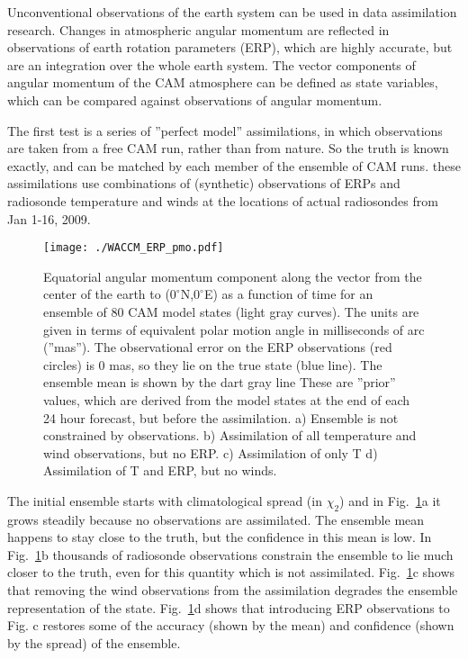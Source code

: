 %
%

Unconventional observations of the earth system can
be used in data assimilation research.
Changes in atmospheric angular momentum are reflected in observations
of earth rotation parameters (ERP),
which are highly accurate, but are an integration over the whole earth system.
The vector components of angular momentum of the CAM atmosphere 
can be defined as state variables,
which can be compared against observations of angular momentum.

The first test is a series of ''perfect model'' assimilations,
in which observations are taken from a free CAM run,
rather than from nature.
So the truth is known exactly, 
and can be matched by each member of the ensemble of CAM runs.
these assimilations use combinations of (synthetic) observations 
of ERPs and radiosonde temperature and winds
at the locations of actual radiosondes from Jan 1-16, 2009.


\begin{figure}[h]
\begin{center}
\texttt{[image: ./WACCM\_ERP\_pmo.pdf]}
\caption{
Equatorial angular momentum component along the vector 
from the center of the earth to ($0^\circ$N,$0^\circ$E)
as a function of time for an ensemble of 80 CAM model states (light gray curves).
The units are given in terms of equivalent polar motion angle in milliseconds of arc (''mas'').
The observational error on the ERP observations (red circles) is 0 mas, 
so they lie on the true state (blue line).
The ensemble mean is shown by the dart gray line
These are ''prior'' values, which are derived from the model states 
at the end of each 24 hour forecast, but before the assimilation.  
a) Ensemble is not constrained by observations.
b) Assimilation of all temperature and wind observations, but no ERP.
c) Assimilation of only T
d) Assimilation of T and ERP, but no winds.
}
\end{center}
\label{fig:ang_mom}
\end{figure}

The initial ensemble starts with climatological spread (in $\chi_2$)
and in Fig.~\ref{fig:ang_mom}a it grows steadily because no observations are assimilated.
The ensemble mean happens to stay close to the truth,
but the confidence in this mean is low.
In Fig.~\ref{fig:ang_mom}b thousands of radiosonde observations constrain the ensemble 
to lie much closer to the truth,
even for this quantity which is not assimilated.
Fig.~\ref{fig:ang_mom}c shows that removing the wind observations from the assimilation
degrades the ensemble representation of the state.
Fig.~\ref{fig:ang_mom}d shows that introducing ERP observations to Fig. c restores
some of the accuracy (shown by the mean) and confidence (shown by the spread)
of the ensemble.

